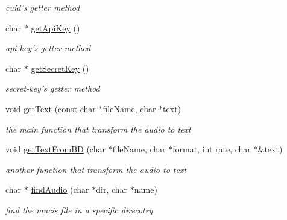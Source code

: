 \begin{DoxyCompactItemize}
\begin{DoxyCompactList}\small\item\em cuid's getter method \end{DoxyCompactList}\item 
\hypertarget{classAudio2Text_a9b6ea96fb317eca4e1f7d4175ae48ec1}{char $\ast$ \hyperlink{classAudio2Text_a9b6ea96fb317eca4e1f7d4175ae48ec1}{get\-Api\-Key} ()}\label{classAudio2Text_a9b6ea96fb317eca4e1f7d4175ae48ec1}

\begin{DoxyCompactList}\small\item\em api-\/key's getter method \end{DoxyCompactList}\item 
\hypertarget{classAudio2Text_a2dcd3865a05a056df483f35bcc8d590f}{char $\ast$ \hyperlink{classAudio2Text_a2dcd3865a05a056df483f35bcc8d590f}{get\-Secret\-Key} ()}\label{classAudio2Text_a2dcd3865a05a056df483f35bcc8d590f}

\begin{DoxyCompactList}\small\item\em secret-\/key's getter method \end{DoxyCompactList}\item 
void \hyperlink{classAudio2Text_a6111b4b2b34ed3298e80011c721c4583}{get\-Text} (const char $\ast$file\-Name, char $\ast$text)
\begin{DoxyCompactList}\small\item\em the main function that transform the audio to text \end{DoxyCompactList}\item 
void \hyperlink{classAudio2Text_a009529cf062579d5edbfe5c215b36118}{get\-Text\-From\-B\-D} (char $\ast$file\-Name, char $\ast$format, int rate, char $\ast$\&text)
\begin{DoxyCompactList}\small\item\em another function that transform the audio to text \end{DoxyCompactList}\item 
char $\ast$ \hyperlink{classAudio2Text_adc13d9d16acb8fd48bc5ed44252b8ebc}{find\-Audio} (char $\ast$dir, char $\ast$name)
\begin{DoxyCompactList}\small\item\em find the mucis file in a specific direcotry \end{DoxyCompactList}\end{DoxyCompactItemize}
